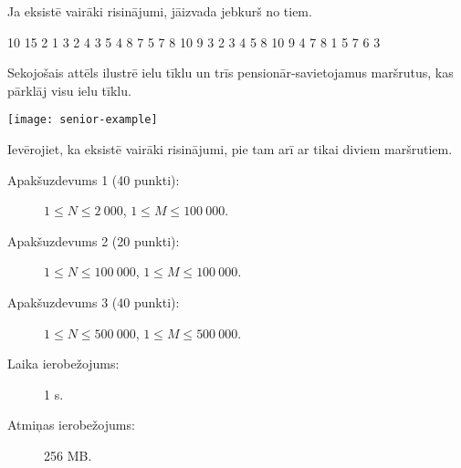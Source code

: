 \documentclass{boi2014-lv}
\begin{document}
		Ja eksistē vairāki risinājumi, jāizvada jebkurš no tiem.

    \Example

    \example
    {
        10 15  2  1 3  2 4  3 5  4 8  7  5 7  8  10  9
    }
    {
        3  2 3 4 5 8 10 9  4 7 8  1 5 7 6 3
    }
    {
        Sekojošais attēls ilustrē ielu tīklu un trīs pensionār-savietojamus maršrutus, kas pārklāj visu ielu tīklu.

        \texttt{[image: senior-example]}

				Ievērojiet, ka eksistē vairāki risinājumi, pie tam arī ar tikai diviem maršrutiem.
    
    }

    \Scoring

    \begin{description}
        \item[Apakšuzdevums 1 (40 punkti):] $1 \le N \le 2\ 000$, $1 \le M \le 100\ 000$.
        \item[Apakšuzdevums 2 (20 punkti):] $1 \le N \le 100\ 000$, $1 \le M \le 100\ 000$.
        \item[Apakšuzdevums 3 (40 punkti):] $1 \le N \le 500\ 000$, $1 \le M \le 500\ 000$.
    \end{description}

    \Constraints

    \begin{description}
        \item[Laika ierobežojums:] 1 s.
        \item[Atmiņas ierobežojums:] 256 MB.
    \end{description}
\end{document}

